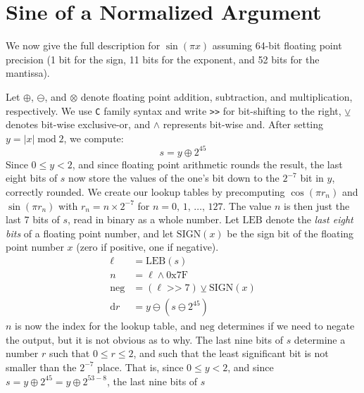 \documentclass{article}
\theoremstyle{plain}
\begin{document}
    \section{Sine of a Normalized Argument}
        We now give the full description for $\sin(\pi{x})$ assuming 64-bit
        floating point precision (1 bit for the sign, 11 bits for the exponent,
        and 52 bits for the mantissa).
        \par\hfill\par
        Let $\oplus$, $\ominus$, and $\otimes$ denote floating point addition,
        subtraction, and multiplication, respectively. We use \texttt{C} family
        syntax and write \texttt{>>} for bit-shifting to the right,
        $\veebar$ denotes bit-wise exclusive-or, and
        $\land$ represents bit-wise and.
        After setting $y=|x|\;\textrm{mod}\;2$, we compute:
        \begin{equation}
            s=y\oplus{2}^{45}
        \end{equation}
        Since $0\leq{y}<2$, and since floating point arithmetic rounds the
        result, the last eight bits of $s$ now store the values of the one's bit
        down to the $2^{-7}$ bit in $y$, correctly rounded. We create our
        lookup tables by precomputing $\cos(\pi{r}_{n})$ and
        $\sin(\pi{r}_{n})$ with $r_{n}=n\times2^{-7}$ for
        $n=0,\,1,\,\dots,\,127$. The value $n$ is then just the last 7 bits of
        $s$, read in binary as a whole number. Let $\textrm{LEB}$ denote the
        \textit{last eight bits} of a floating point number, and let
        $\textrm{SIGN}(x)$ be the sign bit of the floating point number $x$
        (zero if positive, one if negative).
        \begin{align}
            \ell&=\textrm{LEB}(s)\\
            n&=\ell\land\textrm{0x7F}\\
            \textrm{neg}&=(\ell\;\texttt{>>}\;7)\veebar\textrm{SIGN}(x)\\
            \textrm{d}r&=y\ominus(s\ominus2^{45})
        \end{align}
        $n$ is now the index for the lookup table, and $\textrm{neg}$ determines
        if we need to negate the output, but it is not obvious as to why.
        The last nine bits of $s$ determine a number $r$ such that
        $0\leq{r}\leq{2}$, and such that the least significant bit is not
        smaller than the $2^{-7}$ place. That is, since $0\leq{y}<2$, and since
        $s=y\oplus{2}^{45}=y\oplus{2}^{53-8}$, the last nine bits of $s$
\end{document}
